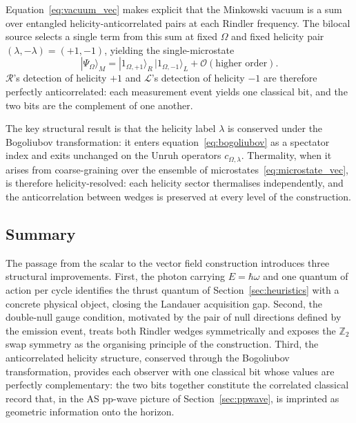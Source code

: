 \documentclass[12pt,a4paper]{article}
\begin{document}
Equation~\eqref{eq:vacuum_vec} makes explicit that the Minkowski vacuum is a sum over
entangled helicity-anticorrelated pairs at each Rindler frequency. The bilocal source
selects a single term from this sum at fixed $\Omega$ and fixed helicity pair
$(\lambda, -\lambda) = (+1,-1)$, yielding the single-microstate
\begin{equation}
    |\Psi_{\Omega}\rangle_M
    = |1_{\Omega,+1}\rangle_R\,|1_{\Omega,-1}\rangle_L
      + \mathcal{O}(\text{higher order}).
\label{eq:microstate_vec}
\end{equation}
$\mathcal{R}$'s detection of helicity $+1$ and $\mathcal{L}$'s detection of helicity $-1$ are therefore
perfectly anticorrelated: each measurement event yields one classical bit, and the two bits
are the complement of one another.

The key structural result is that the helicity label $\lambda$ is conserved under the
Bogoliubov transformation: it enters equation~\eqref{eq:bogoliubov} as a spectator index and
exits unchanged on the Unruh operators $c_{\Omega,\lambda}$. Thermality, when it arises from
coarse-graining over the ensemble of microstates~\eqref{eq:microstate_vec}, is therefore
helicity-resolved: each helicity sector thermalises independently, and the anticorrelation
between wedges is preserved at every level of the construction.

\subsection{Summary}

The passage from the scalar to the vector field construction introduces three structural
improvements. First, the photon carrying $E = \hbar\omega$ and one quantum of action per
cycle identifies the thrust quantum of Section~\ref{sec:heuristics} with a concrete physical
object, closing the Landauer acquisition gap. Second, the double-null gauge condition,
motivated by the pair of null directions defined by the emission event, treats both Rindler
wedges symmetrically and exposes the $\mathbb{Z}_2$ swap symmetry as the organising principle
of the construction. Third, the anticorrelated helicity structure, conserved through the
Bogoliubov transformation, provides each observer with one classical bit whose values are
perfectly complementary: the two bits together constitute the correlated classical record
that, in the AS pp-wave picture of Section~\ref{sec:ppwave}, is imprinted as geometric
information onto the horizon.
\end{document}
